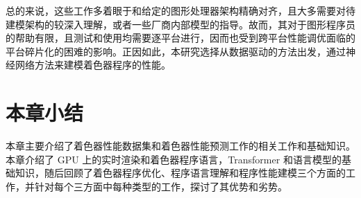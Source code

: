 



总的来说，这些工作多着眼于和给定的图形处理器架构精确对齐，且大多需要对待建模架构的较深入理解，或者一些厂商内部模型的指导。故而，其对于图形程序员的帮助有限，且测试和使用均需要逐平台进行，因而也受到跨平台性能调优面临的平台碎片化的困难的影响。正因如此，本研究选择从数据驱动的方法出发，通过神经网络方法来建模着色器程序的性能。


\section{{\added 本章小结}}

{\added 本章主要介绍了着色器性能数据集和着色器性能预测工作的相关工作和基础知识。本章介绍了 GPU 上的实时渲染和着色器程序语言，Transformer 和语言模型的基础知识，随后回顾了着色器程序优化、程序语言理解和程序性能建模三个方面的工作，并针对每个三方面中每种类型的工作，探讨了其优势和劣势。}
